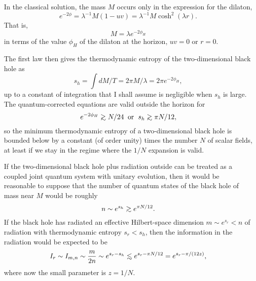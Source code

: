 \documentclass[12pt]{article}
\begin{document}
\baselineskip 15.1pt
	In the classical solution, the mass $M$ occurs only
in the expression for the dilaton,
	\begin{equation}
	e^{-2\phi}=\lambda^{-1}M(1-uv)
	=\lambda^{-1}M\cosh^2(\lambda r).
	\end{equation}
That is,
	\begin{equation}
	M=\lambda e^{-2\phi_H}
	\end{equation}
in terms of the value $\phi_H$ of the dilaton at the horizon,
$uv=0$ or $r=0$.

	The first law then gives the thermodynamic entropy
of the two-dimensional black hole as
	\begin{equation}
	s_h=\int dM/T=2\pi M/\lambda=2\pi e^{-2\phi_H},
	\end{equation}
up to a constant of integration that I shall assume is
negligible when $s_h$ is large.  The quantum-corrected
equations \cite{CGHS} are valid outside the horizon for
	\begin{equation}
	e^{-2\phi_H}
	{\;\raise.3ex\hbox{$>$\kern-.75em\lower1ex\hbox{$\sim$}}\;}
	N/24\;\;
	\mbox{\rm or }\;s_h
	{\;\raise.3ex\hbox{$>$\kern-.75em\lower1ex\hbox{$\sim$}}\;}
	\pi N/12,
	\end{equation}
so the minimum thermodynamic entropy of a
two-dimensional black hole is bounded below by a
constant (of order unity) times the number $N$ of scalar fields,
at least if we stay in the regime where the $1/N$ expansion
is valid.

	If the two-dimensional black hole plus radiation
outside can be treated as a coupled joint quantum
system with unitary evolution, then it would be reasonable
to suppose that the number of quantum states of the
black hole of mass near $M$ would be roughly
	\begin{equation}
	n\sim e^{s_h}
	{\;\raise.3ex\hbox{$>$\kern-.75em\lower1ex\hbox{$\sim$}}\;}
	e^{\pi N/12}.
	\end{equation}
If the black hole has radiated an effective Hilbert-space
dimension $m\sim e^{s_r}<n$ of radiation with
thermodynamic entropy $s_r<s_h$, then the information
in the radiation would be expected to be
	\begin{equation}
	I_r\sim I_{m,n}\sim\frac{m}{2n}\sim e^{s_r-s_h}
	{\;\raise.3ex\hbox{$<$\kern-.75em\lower1ex\hbox{$\sim$}}\;}
	e^{s_r-\pi N/12}=e^{s_r-\pi/(12z)},
	\end{equation}
where now the small parameter is $z=1/N$.
\end{document}
